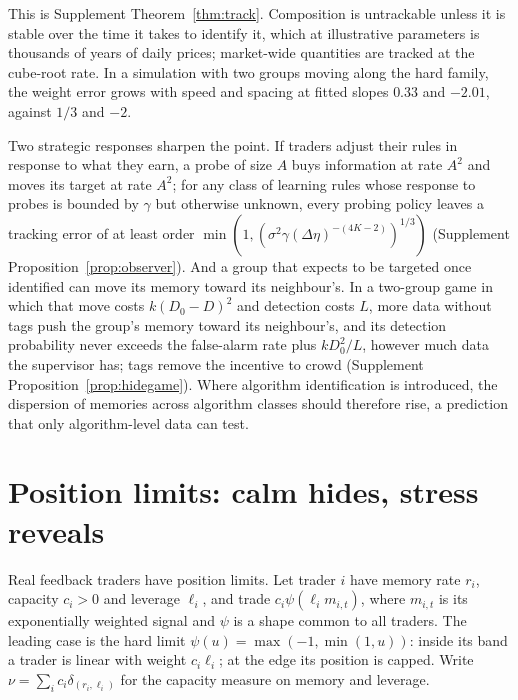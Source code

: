 \documentclass[12pt]{article}
\theoremstyle{definition}
\theoremstyle{remark}
\begin{document}
This is Supplement Theorem~\ref{thm:track}. Composition is untrackable unless it is stable over the time it takes to identify it, which at illustrative parameters is thousands of years of daily prices; market-wide quantities are tracked at the cube-root rate. In a simulation with two groups moving along the hard family, the weight error grows with speed and spacing at fitted slopes $0.33$ and $-2.01$, against $1/3$ and $-2$.

Two strategic responses sharpen the point. If traders adjust their rules in response to what they earn, a probe of size $A$ buys information at rate $A^2$ and moves its target at rate $A^2$; for any class of learning rules whose response to probes is bounded by $\gamma$ but otherwise unknown, every probing policy leaves a tracking error of at least order $\min(1,(\sigma^2\gamma(\Delta\eta)^{-(4K-2)})^{1/3})$ (Supplement Proposition~\ref{prop:observer}). And a group that expects to be targeted once identified can move its memory toward its neighbour's. In a two-group game in which that move costs $k(D_0-D)^2$ and detection costs $L$, more data without tags push the group's memory toward its neighbour's, and its detection probability never exceeds the false-alarm rate plus $kD_0^2/L$, however much data the supervisor has; tags remove the incentive to crowd (Supplement Proposition~\ref{prop:hidegame}). Where algorithm identification is introduced, the dispersion of memories across algorithm classes should therefore rise, a prediction that only algorithm-level data can test.

\section{Position limits: calm hides, stress reveals}\label{n:sat}

Real feedback traders have position limits. Let trader $i$ have memory rate $r_i$, capacity $c_i>0$ and leverage $\ell_i$, and trade $c_i\psi(\ell_im_{i,t})$, where $m_{i,t}$ is its exponentially weighted signal and $\psi$ is a shape common to all traders. The leading case is the hard limit $\psi(u)=\max(-1,\min(1,u))$: inside its band a trader is linear with weight $c_i\ell_i$; at the edge its position is capped. Write $\nu=\sum_ic_i\delta_{(r_i,\ell_i)}$ for the capacity measure on memory and leverage.
\end{document}
